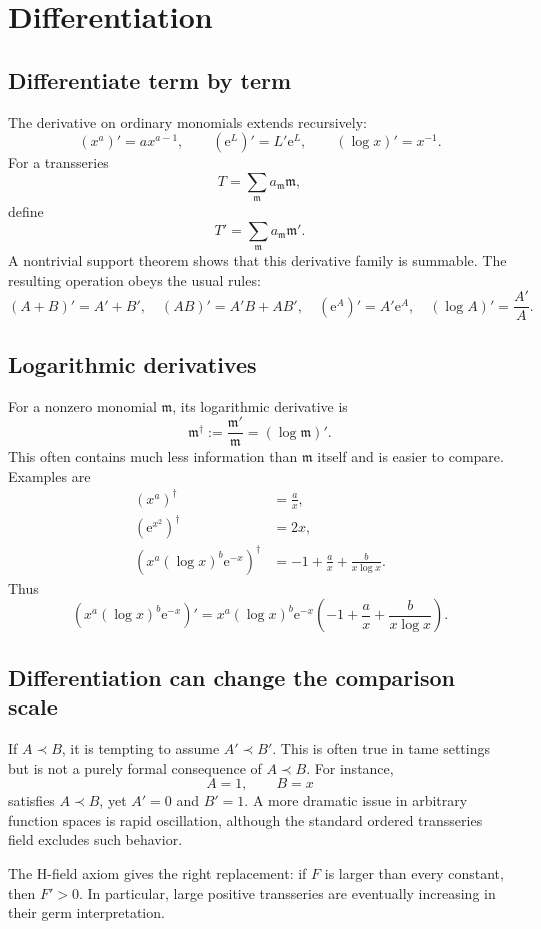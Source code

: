 \documentclass[11pt,openany]{book}
\theoremstyle{plain}
\theoremstyle{definition}
\theoremstyle{remark}
\newcommand{\m}{\mathfrak{m}}
\newcommand{\e}{\mathrm{e}}
\begin{document}
\chapter{Differentiation}
\label{chap:differentiation}

\section{Differentiate term by term}
The derivative on ordinary monomials extends recursively:
\[
  (x^a)'=ax^{a-1},
  \qquad
  (\e^L)'=L'\e^L,
  \qquad
  (\log x)'=x^{-1}.
\]
For a transseries
\[
  T=\sum_{\m}a_{\m}\m,
\]
define
\[
  T'=\sum_{\m}a_{\m}\m'.
\]
A nontrivial support theorem shows that this derivative family is summable. The resulting operation obeys the usual rules:
\[
  (A+B)'=A'+B',
  \quad
  (AB)'=A'B+AB',
  \quad
  (\e^A)'=A'\e^A,
  \quad
  (\log A)'=\frac{A'}A.
\]

\section{Logarithmic derivatives}
For a nonzero monomial $\m$, its logarithmic derivative is
\[
  \m^\dagger:=\frac{\m'}{\m}=(\log\m)'.
\]
This often contains much less information than $\m$ itself and is easier to compare. Examples are
\begin{align*}
  (x^a)^\dagger&=\frac{a}{x},\\
  (\e^{x^2})^\dagger&=2x,\\
  \left(x^a(\log x)^b\e^{-x}\right)^\dagger
  &=-1+\frac{a}{x}+\frac{b}{x\log x}.
\end{align*}
Thus
\[
  \left(x^a(\log x)^b\e^{-x}\right)'
  =x^a(\log x)^b\e^{-x}
   \left(-1+\frac{a}{x}+\frac{b}{x\log x}\right).
\]

\section{Differentiation can change the comparison scale}
If $A\prec B$, it is tempting to assume $A'\prec B'$. This is often true in tame settings but is not a purely formal consequence of $A\prec B$. For instance,
\[
  A=1,
  \qquad B=x
\]
satisfies $A\prec B$, yet $A'=0$ and $B'=1$. A more dramatic issue in arbitrary function spaces is rapid oscillation, although the standard ordered transseries field excludes such behavior.

The H-field axiom gives the right replacement: if $F$ is larger than every constant, then $F'>0$. In particular, large positive transseries are eventually increasing in their germ interpretation.
\end{document}
